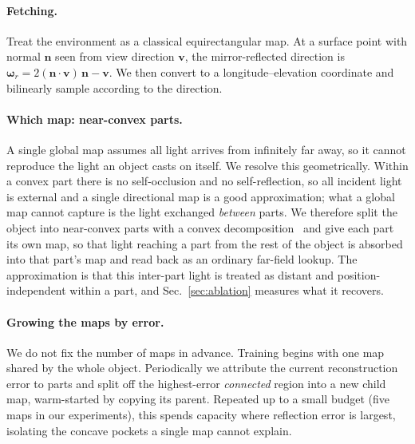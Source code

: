 \paragraph{Fetching.}
Treat the environment as a classical equirectangular map. At a surface point with normal $\mathbf{n}$ seen from view direction $\mathbf{v}$, the mirror-reflected direction is $\boldsymbol{\omega}_r = 2(\mathbf{n}\cdot\mathbf{v})\,\mathbf{n} - \mathbf{v}$. We then convert to a longitude--elevation coordinate and bilinearly sample according to the direction.

\paragraph{Which map: near-convex parts.}
A single global map assumes all light arrives from infinitely far away, so it cannot reproduce the
light an object casts on itself. We resolve this geometrically. Within a convex part there is no
self-occlusion and no self-reflection, so all incident light is external and a single directional
map is a good approximation; what a global map cannot capture is the light exchanged \emph{between}
parts. We therefore split the object into near-convex parts with a convex
decomposition~\citep{coacd} and give each part its own map, so that light reaching a part from the
rest of the object is absorbed into that part's map and read back as an ordinary far-field lookup.
The approximation is that this inter-part light is treated as distant and position-independent
within a part, and
Sec.~\ref{sec:ablation} measures what it recovers.
\paragraph{Growing the maps by error.}
We do not fix the number of maps in advance. Training begins with one map shared by the whole object. Periodically we attribute the current reconstruction error to parts and split off the highest-error \emph{connected} region into a new child map, warm-started by copying its parent. Repeated up to a small budget (five maps in our experiments), this spends capacity where reflection error is largest, isolating the concave pockets a single map cannot explain.


